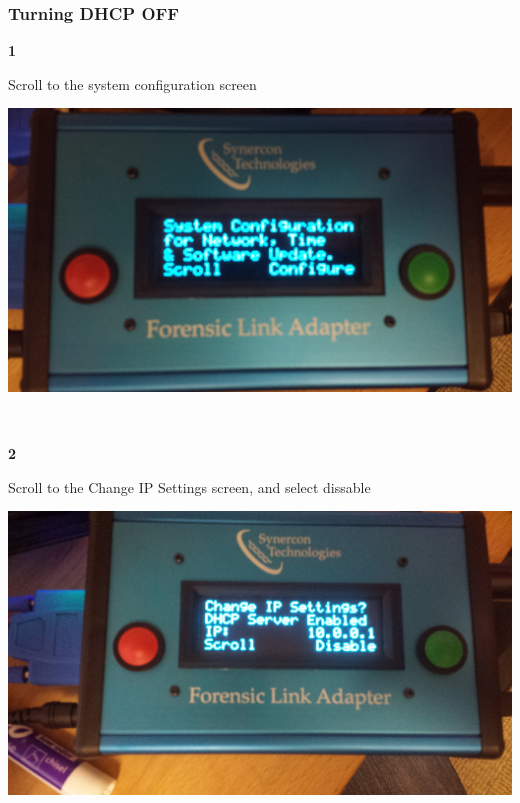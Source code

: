 \documentclass[11pt]{article}
\begin{document}
\subsubsection{Turning DHCP OFF}
\noindent\begin{minipage}{0.3\textwidth}%
\begin{center}
\textbf{1}\\[\baselineskip]
\end{center}
Scroll to the system configuration screen
\end{minipage}%
\hfill%
\begin{minipage}{0.6\textwidth}
\includegraphics[width=\linewidth]{./fla_screens/sys_conf}
\end{minipage}
\\[\baselineskip]
\noindent\begin{minipage}{0.3\textwidth}%
\begin{center}
\textbf{2}\\[\baselineskip]
\end{center}
Scroll to the Change IP Settings screen, and select dissable
\end{minipage}%
\hfill%
\begin{minipage}{0.6\textwidth}
\includegraphics[width=\linewidth]{./fla_screens/sys_conf_dhcp_enable}
\end{minipage}
\end{document}
